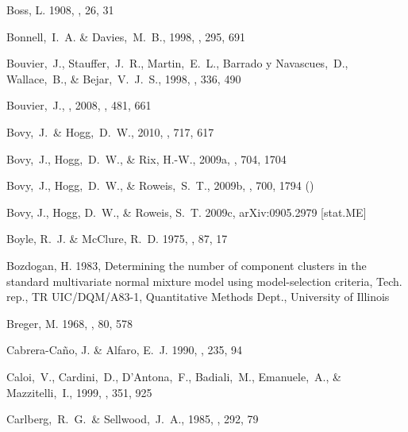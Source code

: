 \begin{thebibliography}{99}
{Boss}, L. 1908, \aj, 26, 31

  Bonnell,~I.~A. \& Davies,~M.~B., 1998,
  \mnras, 295, 691

  Bouvier,~J., Stauffer,~J.~R., Martin,~E.~L., Barrado y Navascues,~D., Wallace,~B., \& Bejar,~V.~J.~S., 1998,
  \aap, 336, 490

  Bouvier,~J., \etal, 2008,
  \aap, 481, 661

 Bovy,~J.~\& Hogg,~D.~W., 2010,
  \apj, 717, 617


  Bovy,~J., Hogg,~D.~W., \& Rix, H.-W., 2009a,
  \apj, 704, 1704

  Bovy,~J., Hogg,~D.~W., \& Roweis,~S.~T., 2009b,
  \apj, 700, 1794 (\bhr)

{Bovy}, J., {Hogg}, D.~W., \& {Roweis}, S.~T. 2009c, {arXiv:0905.2979 [stat.ME]}

{Boyle}, R.~J. \& {McClure}, R.~D. 1975, \pasp, 87, 17

{Bozdogan}, H. 1983, {Determining the number of component clusters in the
  standard multivariate normal mixture model using model-selection criteria},
  Tech. rep., {TR UIC/DQM/A83-1, Quantitative Methods Dept., University of
  Illinois}

{Breger}, M. 1968, \pasp, 80, 578

{Cabrera-Ca\~{n}o}, J. \& {Alfaro}, E.~J. 1990, \aap, 235, 94

  Caloi,~V., Cardini,~D., D'Antona,~F., Badiali,~M., Emanuele,~A., \& Mazzitelli,~I., 1999,
  \aap, 351, 925

  Carlberg,~R.~G.~\& Sellwood,~J.~A., 1985,
  \apj, 292, 79


\end{thebibliography}
